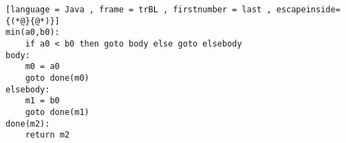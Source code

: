 \begin{lstlisting}[language = Java , frame = trBL , firstnumber = last , escapeinside={(*@}{@*)}]
min(a0,b0):
    if a0 < b0 then goto body else goto elsebody
body:
    m0 = a0
    goto done(m0)
elsebody:
    m1 = b0
    goto done(m1)
done(m2):
    return m2
\end{lstlisting}